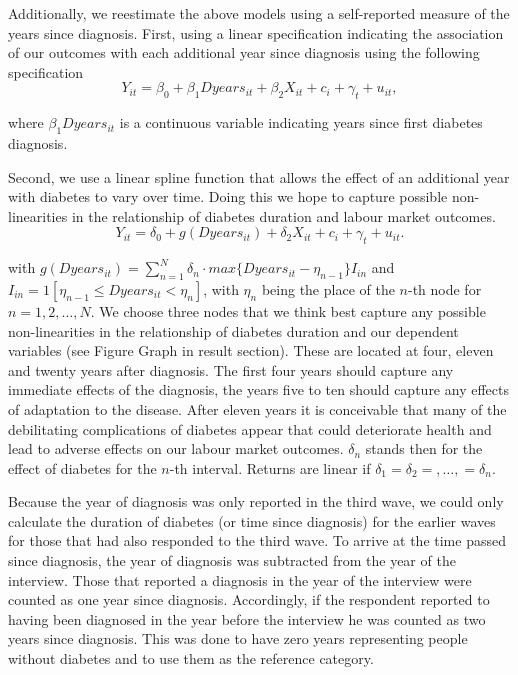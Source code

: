 Additionally, we reestimate the above models using a self-reported
measure of the years since diagnosis. First, using a linear specification
indicating the association of our outcomes with each additional year
since diagnosis using the following specification
\noindent 
\begin{equation}
Y_{it}=\beta_{0}+\beta_{1}Dyears_{it}+\beta_{2}X_{it}+c_{i}+\gamma_{t}+u_{it},\label{eq:duration_linear}
\end{equation}

where $\beta_{1}Dyears_{it}$ is a continuous variable indicating years since first diabetes diagnosis.

Second, we use a linear spline function that allows the effect of an additional year with diabetes to vary over time. Doing this we hope to capture possible non-linearities in the relationship of diabetes duration
and labour market outcomes.
\noindent 
\begin{equation}
Y_{it}=\delta_{0}+g(Dyears_{it})+\delta_{2}X_{it}+c_{i}+\gamma_{t}+u_{it}.\label{eq:splines}
\end{equation}


with $g(Dyears_{it})=\sum_{n=1}^{N}\delta_{n}\cdot max\{Dyears_{it}-\eta_{n-1}\}I_{in}$
and $I_{in}=1[\eta_{n-1}\leq Dyears_{it}<\eta_{n}]$, with $\eta_{n}$ being the place of the $n$-th node for $n=1,2,\ldots,N$. We choose three nodes that we think best capture any possible non-linearities in the relationship of diabetes duration and our dependent variables (see Figure Graph in result section). These are located at four, eleven and twenty years after diagnosis. The first four years should capture any immediate effects of the diagnosis, the years five to ten should capture any effects of adaptation to the disease. After eleven years it is conceivable that many of the debilitating complications of diabetes appear that could deteriorate health and lead to adverse effects on our labour market outcomes.  $\delta_{n}$ stands then for the effect of diabetes for the $n$-th interval. Returns are linear if $\delta_{1}=\delta_{2}=,\ldots,=\delta_{n}$.

Because the year of diagnosis was only
reported in the third wave, we could only calculate the duration of
diabetes (or time since diagnosis) for the earlier waves for those
that had also responded to the third wave. To arrive at the time passed
since diagnosis, the year of diagnosis was subtracted from the year
of the interview. Those that reported a diagnosis in the year of the
interview were counted as one year since diagnosis. Accordingly, if
the respondent reported to having been diagnosed in the year before
the interview he was counted as two years since diagnosis. This was
done to have zero years representing people without diabetes and to
use them as the reference category.


